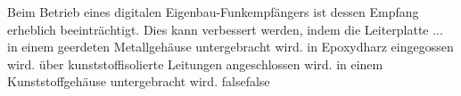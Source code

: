     {Beim Betrieb eines digitalen Eigenbau-Funkempfängers ist dessen Empfang erheblich beeinträchtigt. Dies kann verbessert werden, indem die Leiterplatte ...}
    {in einem geerdeten Metallgehäuse untergebracht wird.}
    {in Epoxydharz eingegossen wird.}
    {über kunststoffisolierte Leitungen angeschlossen wird.}
    {in einem Kunststoffgehäuse untergebracht wird.}
    {false}{false}